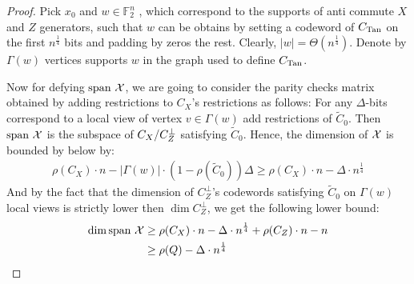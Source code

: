 \documentclass[manuscript,screen,review]{acmart}
\begin{document}
\begin{proof}
  Pick $x_{0}$ and $w \in \mathbb{F}_{2}^{n}$ , which correspond to the supports of anti commute $X$ and $Z$ generators, such that $w$ can be obtains by setting a codeword of $C_{\text{Tan}}$ on the first $n^{\frac{1}{4}}$ bits and padding by zeros the rest. Clearly, $|w| = \Theta(n^{\frac{1}{4}})$. Denote by $\Gamma(w)$ vertices supports $w$ in the graph used to define $C_{\text{Tan}}$.  

  Now for defying $\text{span }\mathcal{X}$, we are going to consider the parity checks matrix obtained by adding restrictions to $C_{X}$'s restrictions as follows: For any $\Delta$-bits correspond to a local view of vertex $v \in \Gamma(w)$ add restrictions of $\tilde{C}_{0}$. Then $\text{span }\mathcal{X}$ is the subspace of $C_{X}/C_{Z}^\perp$ satisfying $\tilde{C}_{0}$. Hence, the dimension of $\mathcal{X}$ is bounded by below by: 
  \begin{equation*}
    \begin{split}
      \rho(C_{X})\cdot n - |\Gamma(w)|\cdot (1 - \rho(\tilde{C}_{0}))\Delta \ge \rho(C_{X})\cdot n - \Delta \cdot n^{\frac{1}{4}}
    \end{split}
  \end{equation*}
  And by the fact that the dimension of $C_{Z}^\perp$'s codewords satisfying $\tilde{C}_{0}$ on $\Gamma(w)$ local views is strictly lower then $\dim C_{Z}^\perp$, we get the following lower bound:
  \begin{equation*}
    \begin{split}
      \dim \text{span } \mathcal{X} & \ge \rho(C_{X})\cdot n - \Delta \cdot n^{\frac{1}{4}} + \rho(C_{Z})\cdot n - n \\
     & \ge \rho (Q) - \Delta \cdot n^{\frac{1}{4}}
    \end{split}
  \end{equation*}
\end{proof}
\end{document}
